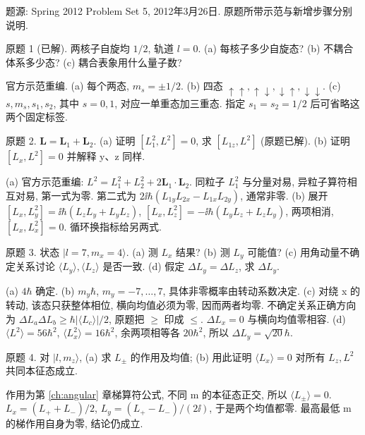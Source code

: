 题源: Spring 2012 Problem Set 5, 2012年3月26日. 原题所带示范与新增步骤分别说明.
\begin{exercise}\label{ex:2202-5-1}
原题 1 (已解). 两核子自旋均 $1/2$, 轨道 $l=0$. (a) 每核子多少自旋态? (b) 不耦合体系多少态? (c) 耦合表象用什么量子数?
\end{exercise}
\begin{solution}
官方示范重编. (a) 每个两态, $m_s=\pm1/2$. (b) 四态 $\uparrow\uparrow,\uparrow\downarrow,\downarrow\uparrow,\downarrow\downarrow$. (c) $s,m_s,s_1,s_2$, 其中 $s=0,1$, 对应一单重态加三重态. 指定 $s_1=s_2=1/2$ 后可省略这两个固定标签.
\end{solution}
\begin{exercise}\label{ex:2202-5-2}
原题 2. $\mathbf L=\mathbf L_1+\mathbf L_2$. (a) 证明 $[L_1^2,L^2]=0$, 求 $[L_{1z},L^2]$ (原题已解). (b) 证明 $[L_x,L^2]=0$ 并解释 y、z 同样.
\end{exercise}
\begin{solution}
(a) 官方示范重编: $L^2=L_1^2+L_2^2+2\mathbf L_1\cdot\mathbf L_2$. 同粒子 $L_1^2$ 与分量对易, 异粒子算符相互对易, 第一式为零. 第二式为 $2\ii\hbar(L_{1y}L_{2x}-L_{1x}L_{2y})$, 通常非零. (b) 展开 $[L_x,L_y^2]=\ii\hbar(L_zL_y+L_yL_z)$, $[L_x,L_z^2]=-\ii\hbar(L_yL_z+L_zL_y)$, 两项相消, $[L_x,L_x^2]=0$. 循环换指标给另两式.
\end{solution}
\begin{exercise}\label{ex:2202-5-3}
原题 3. 状态 $|l=7,m_x=4\rangle$. (a) 测 $L_x$ 结果? (b) 测 $L_y$ 可能值? (c) 用角动量不确定关系讨论 $\langle L_y\rangle,\langle L_z\rangle$ 是否一致. (d) 假定 $\Delta L_y=\Delta L_z$, 求 $\Delta L_y$.
\end{exercise}
\begin{solution}
(a) $4\hbar$ 确定. (b) $m_y\hbar$, $m_y=-7,\ldots,7$, 具体非零概率由转动系数决定. (c) 对绕 x 的转动, 该态只获整体相位, 横向均值必须为零, 因而两者均零. 不确定关系正确方向为 $\Delta L_a\Delta L_b\ge\hbar|\langle L_c\rangle|/2$, 原题把 $\ge$ 印成 $\le$. $\Delta L_x=0$ 与横向均值零相容. (d) $\langle L^2\rangle=56\hbar^2$, $\langle L_x^2\rangle=16\hbar^2$, 余两项相等各 $20\hbar^2$, 所以 $\Delta L_y=\sqrt{20}\hbar$.
\end{solution}
\begin{exercise}\label{ex:2202-5-4}
原题 4. 对 $|l,m_z\rangle$, (a) 求 $L_\pm$ 的作用及均值; (b) 用此证明 $\langle L_x\rangle=0$ 对所有 $L_z,L^2$ 共同本征态成立.
\end{exercise}
\begin{solution}
作用为第 \ref{ch:angular} 章梯算符公式, 不同 m 的本征态正交, 所以 $\langle L_\pm\rangle=0$. $L_x=(L_++L_-)/2$, $L_y=(L_+-L_-)/(2\ii)$, 于是两个均值都零. 最高最低 m 的梯作用自身为零, 结论仍成立.
\end{solution}
